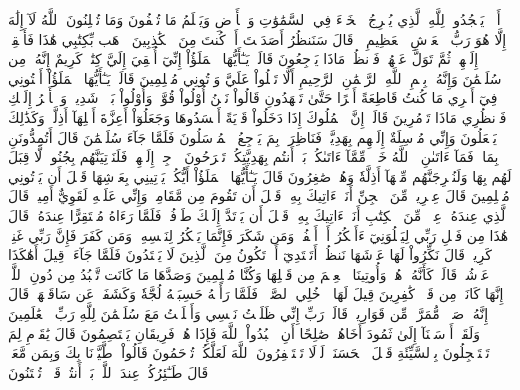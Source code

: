 أَلَّاۤ يَسۡجُدُواْۤ لِلَّهِ ٱلَّذِي يُخۡرِجُ ٱلۡخَبۡءَ فِي ٱلسَّمَٰوَٰتِ وَٱلۡأَرۡضِ وَيَعۡلَمُ مَا تُخۡفُونَ وَمَا تُعۡلِنُونَ
ٱللَّهُ لَآ إِلَٰهَ إِلَّا هُوَ رَبُّ ٱلۡعَرۡشِ ٱلۡعَظِيمِ۩
۞قَالَ سَنَنظُرُ أَصَدَقۡتَ أَمۡ كُنتَ مِنَ ٱلۡكَٰذِبِينَ
ٱذۡهَب بِّكِتَٰبِي هَٰذَا فَأَلۡقِهۡ إِلَيۡهِمۡ ثُمَّ تَوَلَّ عَنۡهُمۡ فَٱنظُرۡ مَاذَا يَرۡجِعُونَ
قَالَتۡ يَـٰٓأَيُّهَا ٱلۡمَلَؤُاْ إِنِّيٓ أُلۡقِيَ إِلَيَّ كِتَٰبٞ كَرِيمٌ
إِنَّهُۥ مِن سُلَيۡمَٰنَ وَإِنَّهُۥ بِسۡمِ ٱللَّهِ ٱلرَّحۡمَٰنِ ٱلرَّحِيمِ
أَلَّا تَعۡلُواْ عَلَيَّ وَأۡتُونِي مُسۡلِمِينَ
قَالَتۡ يَـٰٓأَيُّهَا ٱلۡمَلَؤُاْ أَفۡتُونِي فِيٓ أَمۡرِي مَا كُنتُ قَاطِعَةً أَمۡرًا حَتَّىٰ تَشۡهَدُونِ
قَالُواْ نَحۡنُ أُوْلُواْ قُوَّةٖ وَأُوْلُواْ بَأۡسٖ شَدِيدٖ وَٱلۡأَمۡرُ إِلَيۡكِ فَٱنظُرِي مَاذَا تَأۡمُرِينَ
قَالَتۡ إِنَّ ٱلۡمُلُوكَ إِذَا دَخَلُواْ قَرۡيَةً أَفۡسَدُوهَا وَجَعَلُوٓاْ أَعِزَّةَ أَهۡلِهَآ أَذِلَّةٗۚ وَكَذَٰلِكَ يَفۡعَلُونَ
وَإِنِّي مُرۡسِلَةٌ إِلَيۡهِم بِهَدِيَّةٖ فَنَاظِرَةُۢ بِمَ يَرۡجِعُ ٱلۡمُرۡسَلُونَ
فَلَمَّا جَآءَ سُلَيۡمَٰنَ قَالَ أَتُمِدُّونَنِ بِمَالٖ فَمَآ ءَاتَىٰنِۦَ ٱللَّهُ خَيۡرٞ مِّمَّآ ءَاتَىٰكُمۚ بَلۡ أَنتُم بِهَدِيَّتِكُمۡ تَفۡرَحُونَ
ٱرۡجِعۡ إِلَيۡهِمۡ فَلَنَأۡتِيَنَّهُم بِجُنُودٖ لَّا قِبَلَ لَهُم بِهَا وَلَنُخۡرِجَنَّهُم مِّنۡهَآ أَذِلَّةٗ وَهُمۡ صَٰغِرُونَ
قَالَ يَـٰٓأَيُّهَا ٱلۡمَلَؤُاْ أَيُّكُمۡ يَأۡتِينِي بِعَرۡشِهَا قَبۡلَ أَن يَأۡتُونِي مُسۡلِمِينَ
قَالَ عِفۡرِيتٞ مِّنَ ٱلۡجِنِّ أَنَا۠ ءَاتِيكَ بِهِۦ قَبۡلَ أَن تَقُومَ مِن مَّقَامِكَۖ وَإِنِّي عَلَيۡهِ لَقَوِيٌّ أَمِينٞ
قَالَ ٱلَّذِي عِندَهُۥ عِلۡمٞ مِّنَ ٱلۡكِتَٰبِ أَنَا۠ ءَاتِيكَ بِهِۦ قَبۡلَ أَن يَرۡتَدَّ إِلَيۡكَ طَرۡفُكَۚ فَلَمَّا رَءَاهُ مُسۡتَقِرًّا عِندَهُۥ قَالَ هَٰذَا مِن فَضۡلِ رَبِّي لِيَبۡلُوَنِيٓ ءَأَشۡكُرُ أَمۡ أَكۡفُرُۖ وَمَن شَكَرَ فَإِنَّمَا يَشۡكُرُ لِنَفۡسِهِۦۖ وَمَن كَفَرَ فَإِنَّ رَبِّي غَنِيّٞ كَرِيمٞ
قَالَ نَكِّرُواْ لَهَا عَرۡشَهَا نَنظُرۡ أَتَهۡتَدِيٓ أَمۡ تَكُونُ مِنَ ٱلَّذِينَ لَا يَهۡتَدُونَ
فَلَمَّا جَآءَتۡ قِيلَ أَهَٰكَذَا عَرۡشُكِۖ قَالَتۡ كَأَنَّهُۥ هُوَۚ وَأُوتِينَا ٱلۡعِلۡمَ مِن قَبۡلِهَا وَكُنَّا مُسۡلِمِينَ
وَصَدَّهَا مَا كَانَت تَّعۡبُدُ مِن دُونِ ٱللَّهِۖ إِنَّهَا كَانَتۡ مِن قَوۡمٖ كَٰفِرِينَ
قِيلَ لَهَا ٱدۡخُلِي ٱلصَّرۡحَۖ فَلَمَّا رَأَتۡهُ حَسِبَتۡهُ لُجَّةٗ وَكَشَفَتۡ عَن سَاقَيۡهَاۚ قَالَ إِنَّهُۥ صَرۡحٞ مُّمَرَّدٞ مِّن قَوَارِيرَۗ قَالَتۡ رَبِّ إِنِّي ظَلَمۡتُ نَفۡسِي وَأَسۡلَمۡتُ مَعَ سُلَيۡمَٰنَ لِلَّهِ رَبِّ ٱلۡعَٰلَمِينَ
وَلَقَدۡ أَرۡسَلۡنَآ إِلَىٰ ثَمُودَ أَخَاهُمۡ صَٰلِحًا أَنِ ٱعۡبُدُواْ ٱللَّهَ فَإِذَا هُمۡ فَرِيقَانِ يَخۡتَصِمُونَ
قَالَ يَٰقَوۡمِ لِمَ تَسۡتَعۡجِلُونَ بِٱلسَّيِّئَةِ قَبۡلَ ٱلۡحَسَنَةِۖ لَوۡلَا تَسۡتَغۡفِرُونَ ٱللَّهَ لَعَلَّكُمۡ تُرۡحَمُونَ
قَالُواْ ٱطَّيَّرۡنَا بِكَ وَبِمَن مَّعَكَۚ قَالَ طَـٰٓئِرُكُمۡ عِندَ ٱللَّهِۖ بَلۡ أَنتُمۡ قَوۡمٞ تُفۡتَنُونَ
